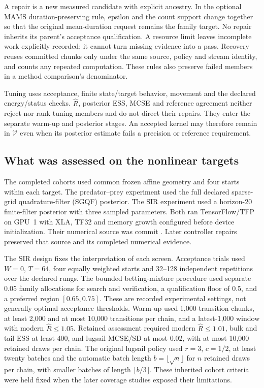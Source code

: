 A repair is a new measured candidate with explicit ancestry. In the optional
MAMS duration-preserving rule, epsilon and the count support change together
so that the original mean-duration request remains the family target.
No repair inherits its parent's acceptance qualification. A resource limit
leaves incomplete work explicitly recorded; it cannot turn missing evidence
into a pass. Recovery reuses committed chunks only under the same source,
policy and stream identity, and counts any repeated computation. These rules
also preserve failed members in a method comparison's denominator.

Tuning uses acceptance, finite state/target behavior, movement and the declared
energy/status checks. $\widehat R$, posterior ESS, MCSE and reference agreement
neither reject nor rank tuning members and do not direct their repairs.
They enter the separate warm-up and posterior stages. An accepted kernel may
therefore remain in $\mathcal V$ even when its posterior estimate fails a
precision or reference requirement.

\subsection{What was assessed on the nonlinear targets}

The completed cohorts used common frozen affine geometry and four starts
within each target. The predator--prey experiment used the full declared
sparse-grid quadrature-filter (SGQF) posterior. The SIR experiment used a
horizon-20 finite-filter posterior with three sampled parameters. Both ran
TensorFlow/TFP on GPU~1 with XLA, TF32 and memory growth configured before
device initialization. Their numerical source was commit
. Later controller repairs
preserved that source and its completed numerical evidence.

The SIR design fixes the interpretation of each screen. Acceptance trials
used $W=0$, $T=64$, four equally weighted starts and 32--128 independent
repetitions over the declared rungs. The bounded betting-mixture procedure
used separate 0.05 family allocations for search and verification, a
qualification floor of 0.5, and a preferred region $[0.65,0.75]$. These are
recorded experimental settings, not generally optimal acceptance thresholds.
Warm-up used 1,000-transition chunks, at least 2,000 and at most 10,000
transitions per chain, and a latest-1,000 window with modern
$\widehat R\leq1.05$. Retained assessment required modern $\widehat R\leq1.01$,
bulk and tail ESS at least 400, and lugsail MCSE/SD at most 0.02, with at
most 10,000 retained draws per chain. The original lugsail policy used
$r=3$, $c=1/2$, at least twenty batches and the automatic batch
length $b=\lfloor\sqrt n\rfloor$ for $n$ retained draws per chain, with
smaller batches of length $\lfloor b/3\rfloor$. These inherited cohort
criteria were held fixed when the later
coverage studies exposed their limitations.


